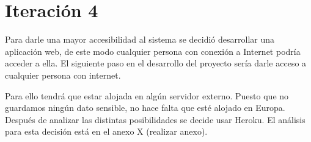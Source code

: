 \section{Iteración 4}

Para darle una mayor accesibilidad al sistema se decidió desarrollar
una aplicación web, de este modo cualquier persona con conexión a
Internet podría acceder a ella. El siguiente paso en el desarrollo
del proyecto sería darle acceso a cualquier persona con internet.

Para ello tendrá que estar alojada en algún servidor externo.
Puesto que no guardamos ningún dato sensible, no hace falta
que esté alojado en Europa. Después de analizar las distintas posibilidades
se decide usar Heroku. El análisis para esta decisión está en el anexo X (realizar anexo).
